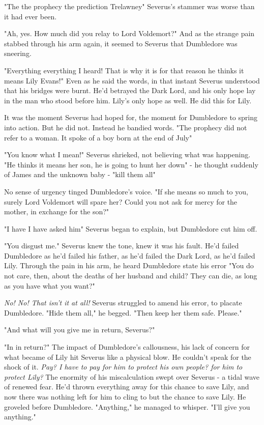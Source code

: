 "The{\el} the prophecy{\el} the prediction{\el} Trelawney{\el}" Severus's stammer was worse than it had ever been.

"Ah, yes. How much did you relay to Lord Voldemort?" And as the strange pain stabbed through his arm again, it seemed to Severus that Dumbledore was sneering.

"Everything{\el} everything I heard! That is why{\el} it is for that reason{\el} he thinks it means Lily Evans!" Even as he said the words, in that instant Severus understood that his bridges were burnt. He'd betrayed the Dark Lord, and his only hope lay in the man who stood before him. Lily's only hope as well. He did this for Lily.

It was the moment Severus had hoped for, the moment for Dumbledore to spring into action. But he did not. Instead he bandied words. "The prophecy did not refer to a woman. It spoke of a boy born at the end of July{\el}"

"You know what I mean!" Severus shrieked, not believing what was happening. "He thinks it means her son, he is going to hunt her down{\el}" - he thought suddenly of James and the unknown baby - "{\el}kill them all{\el}"

No sense of urgency tinged Dumbledore's voice. "If she means so much to you, surely Lord Voldemort will spare her? Could you not ask for mercy for the mother, in exchange for the son?"

"I have{\el} I have asked him{\el}" Severus began to explain, but Dumbledore cut him off.

"You disgust me." Severus knew the tone, knew it was his fault. He'd failed Dumbledore as he'd failed his father, as he'd failed the Dark Lord, as he'd failed Lily. Through the pain in his arm, he heard Dumbledore state his error{\el} "You do not care, then, about the deaths of her husband and child? They can die, as long as you have what you want?"

\emph{No! No! That isn't it at all!} Severus struggled to amend his error, to placate Dumbledore. "Hide them all," he begged. "Then{\el} keep her{\el} them{\el} safe. Please."

"And what will you give me in return, Severus?"

"In{\el} in return?" The impact of Dumbledore's callousness, his lack of concern for what became of Lily hit Severus like a physical blow. He couldn't speak for the shock of it. \emph{Pay? I have to pay for him to protect his own people? for him to protect Lily?} The enormity of his miscalculation swept over Severus - a tidal wave of renewed fear. He'd thrown everything away for this chance to save Lily, and now there was nothing left for him to cling to but the chance to save Lily. He groveled before Dumbledore. "Anything," he managed to whisper. "I'll give you anything."

